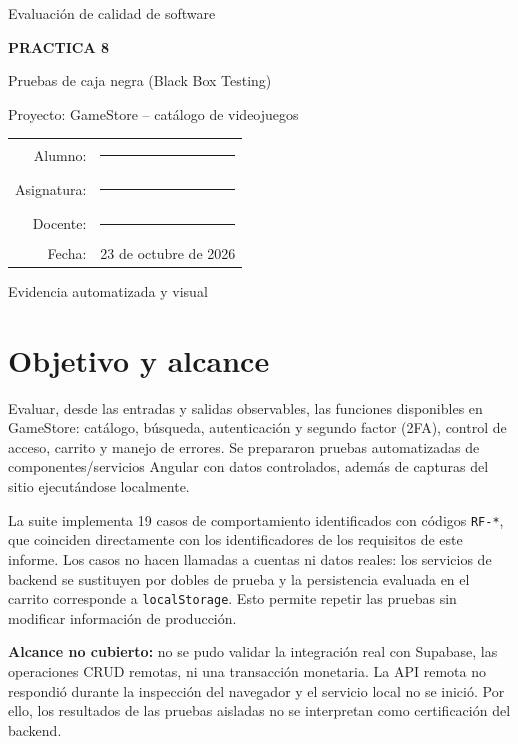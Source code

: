 \documentclass[11pt,letterpaper]{article}
\begin{document}
\begin{titlepage}
  \centering
  \vspace*{2cm}
  {\Large Evaluación de calidad de software\par}
  \vspace{0.5cm}
  {\huge\bfseries PRACTICA 8\par}
  \vspace{0.3cm}
  {\LARGE Pruebas de caja negra (Black Box Testing)\par}
  \vspace{1.5cm}
  {\Large Proyecto: GameStore -- catálogo de videojuegos\par}
  \vfill
  \begin{tabular}{rl}
    Alumno: & \rule{9cm}{0.4pt}\\[0.8cm]
    Asignatura: & \rule{9cm}{0.4pt}\\[0.8cm]
    Docente: & \rule{9cm}{0.4pt}\\[0.8cm]
    Fecha: & 23 de octubre de 2026
  \end{tabular}
  \vfill
  {\large Evidencia automatizada y visual\par}
\end{titlepage}

\tableofcontents
\newpage

\section{Objetivo y alcance}
Evaluar, desde las entradas y salidas observables, las funciones disponibles en GameStore:
catálogo, búsqueda, autenticación y segundo factor (2FA), control de acceso, carrito y manejo de
errores. Se prepararon pruebas automatizadas de componentes/servicios Angular con datos
controlados, además de capturas del sitio ejecutándose localmente.

La suite implementa 19 casos de comportamiento identificados con códigos \texttt{RF-*}, que
coinciden directamente con los identificadores de los requisitos de este informe. Los
casos no hacen llamadas a cuentas ni datos reales: los servicios de backend se sustituyen por
dobles de prueba y la persistencia evaluada en el carrito corresponde a \texttt{localStorage}.
Esto permite repetir las pruebas sin modificar información de producción.

\textbf{Alcance no cubierto:} no se pudo validar la integración real con Supabase, las operaciones
CRUD remotas, ni una transacción monetaria. La API remota no respondió durante la inspección del
navegador y el servicio local no se inició. Por ello, los resultados de las pruebas aisladas no se
interpretan como certificación del backend.
\end{document}
